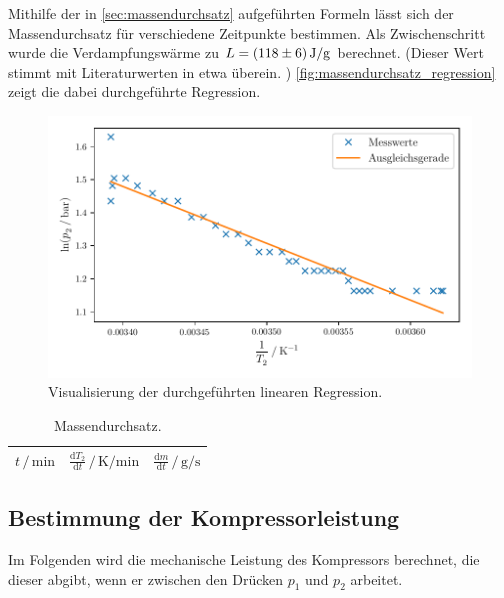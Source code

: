 Mithilfe der in \autoref{sec:massendurchsatz} aufgeführten Formeln
lässt sich der Massendurchsatz für verschiedene Zeitpunkte bestimmen.
Als Zwischenschritt wurde die Verdampfungswärme zu $L=\SI{118 \pm 6}{\joule\per\gram}$ berechnet.
(Dieser Wert stimmt mit Literaturwerten in etwa überein. \cite{verdampfungswaerme})
\autoref{fig:massendurchsatz_regression} zeigt die dabei durchgeführte Regression.

\begin{figure}
  \centering
  \includegraphics{build/plot_massendurchsatz.pdf}
  \caption{Visualisierung der durchgeführten linearen Regression.}
  \label{fig:massendurchsatz_regression}
\end{figure}

\begin{table}
\centering
\caption{Massendurchsatz.}
\begin{tabular}{c c c}
\toprule
$t \,/\, \si{\minute}$ &
$\frac{\mathrm{d}T_2}{\mathrm{d}t} \,/\, \si{\kelvin\per\minute}$ &
$\frac{\mathrm{d}m}{\mathrm{d}t} \,/\, \si{\gram\per\second}$ \\
\midrule

\bottomrule
\end{tabular}
\end{table}

\FloatBarrier

\subsection{Bestimmung der Kompressorleistung} %
Im Folgenden wird die mechanische Leistung des Kompressors berechnet,
die dieser abgibt,
wenn er zwischen den Drücken $p_1$ und $p_2$ arbeitet.

